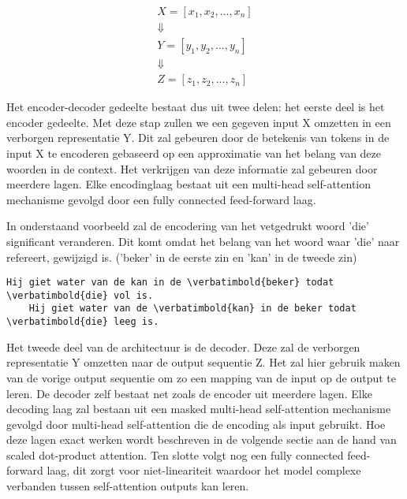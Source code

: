 \begin{equation}
\begin{split}
X = [x_1, x_2, ..., x_n]  \\
\Downarrow \;\;\;\;\;\;\;\;\;\;\;\;\;\;\; \\
Y = [y_1, y_2, ..., y_n] \\
\Downarrow \;\;\;\;\;\;\;\;\;\;\;\;\;\;\; \\
Z = [z_1, z_2, ..., z_n]
\end{split}
\end{equation}
\label{def:chapt2_transformers_encoder_decoder}    


Het encoder-decoder gedeelte bestaat dus uit twee delen: het eerste deel is het encoder gedeelte. Met deze stap zullen we een gegeven input X omzetten in een verborgen representatie Y. Dit zal gebeuren door de betekenis van tokens in de input X te encoderen gebaseerd op een approximatie van het belang van deze woorden in de context. Het verkrijgen van deze informatie zal gebeuren door meerdere lagen. Elke encodinglaag bestaat uit een multi-head self-attention mechanisme gevolgd door een fully connected feed-forward laag.     

In onderstaand voorbeeld zal de encodering van het vetgedrukt woord 'die' significant veranderen. Dit komt omdat het belang van het woord waar 'die' naar refereert, gewijzigd is. ('beker' in de eerste zin en 'kan' in de tweede zin)

\begin{Verbatim}[commandchars=\\\{\}]
    Hij giet water van de kan in de \verbatimbold{beker} todat \verbatimbold{die} vol is.
    Hij giet water van de \verbatimbold{kan} in de beker todat \verbatimbold{die} leeg is.
\end{Verbatim}

Het tweede deel van de architectuur is de decoder. Deze zal de verborgen representatie Y omzetten naar de output sequentie Z. Het zal hier gebruik maken van de vorige output sequentie om zo een mapping van de input op de output te leren. De decoder zelf bestaat net zoals de encoder uit meerdere lagen. Elke decoding laag zal bestaan uit een masked multi-head self-attention mechanisme gevolgd door multi-head self-attention die de encoding als input gebruikt. Hoe deze lagen exact werken wordt beschreven in de volgende sectie aan de hand van scaled dot-product attention. Ten slotte volgt nog een fully connected feed-forward laag, dit zorgt voor niet-lineariteit waardoor het model complexe verbanden tussen self-attention outputs kan leren. 


